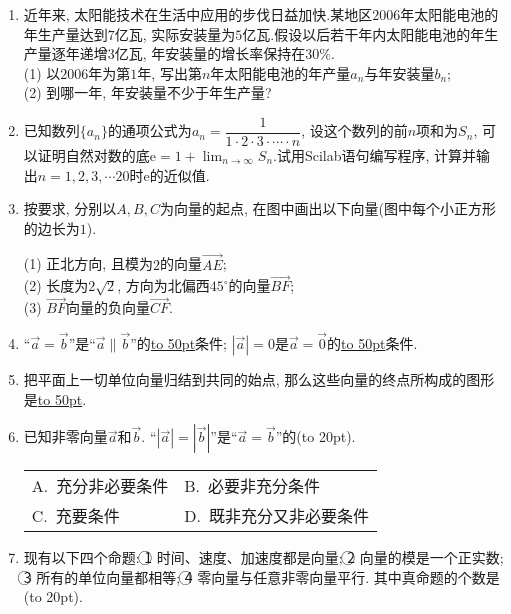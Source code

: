 \documentclass[10pt,a4paper]{article}
\newcommand{\blank}[1]{\underline{\hbox to #1pt{}}}
\newcommand{\bracket}[1]{(\hbox to #1pt{})}
\newcommand{\twoch}[4]{\par\begin{tabular}{p{.46\textwidth}p{.46\textwidth}}
A.~#1& B.~#2\\
C.~#3& D.~#4
\end{tabular}}
\begin{document}
\begin{enumerate}[1.]
\item 近年来, 太阳能技术在生活中应用的步伐日益加快.某地区$2006$年太阳能电池的年生产量达到$7$亿瓦, 实际安装量为$5$亿瓦.假设以后若干年内太阳能电池的年生产量逐年递增$3$亿瓦, 年安装量的增长率保持在$30\%$.\\
(1) 以$2006$年为第$1$年, 写出第$n$年太阳能电池的年产量$a_n$与年安装量$b_n$;\\
(2) 到哪一年, 年安装量不少于年生产量?
\item 已知数列$\{a_n\}$的通项公式为$a_n=\dfrac 1{1\cdot 2\cdot 3\cdot \cdots \cdot n}$, 设这个数列的前$n$项和为$S_n$, 可以证明自然对数的底$\mathrm{e}=1+\displaystyle\lim_{n\to\infty}S_n$.试用Scilab语句编写程序, 计算并输出$n=1,2,3,\cdots 20$时$\mathrm{e}$的近似值.
\item 按要求, 分别以$A,B,C$为向量的起点, 在图中画出以下向量(图中每个小正方形的边长为$1$).
\begin{center}
\end{center}
(1) 正北方向, 且模为$2$的向量$\overrightarrow{AE}$;\\
(2) 长度为$2\sqrt 2$, 方向为北偏西$45^{\circ }$的向量$\overrightarrow{BF}$;\\
(3) $\overrightarrow{BF}$向量的负向量$\overrightarrow{CF}$.
\item ``$\overrightarrow a=\overrightarrow b$''是``$\overrightarrow a\parallel \overrightarrow b$''的\blank{50}条件; $|\overrightarrow a|=0$是$\overrightarrow a=\overrightarrow 0$的\blank{50}条件.
\item 把平面上一切单位向量归结到共同的始点, 那么这些向量的终点所构成的图形是\blank{50}.
\item 已知非零向量$\overrightarrow a$和$\overrightarrow b$. ``$|\overrightarrow a|=|\overrightarrow b|$''是``$\overrightarrow a=\overrightarrow b$''的\bracket{20}.
\twoch{充分非必要条件}{必要非充分条件}{充要条件}{既非充分又非必要条件}
\item 现有以下四个命题:
\textcircled{1} 时间、速度、加速度都是向量;
\textcircled{2} 向量的模是一个正实数;
\textcircled{3} 所有的单位向量都相等;
\textcircled{4} 零向量与任意非零向量平行.
其中真命题的个数是\bracket{20}.

\end{enumerate}
\end{document}
